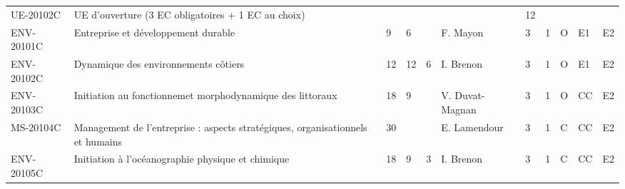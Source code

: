 \documentclass[a4paper,11pt]{article}
\begin{document}
{{\begin{tabular}{lllllllllll}
\rowcolor[HTML]{C0C0C0} 
UE-20102C                      & UE d'ouverture (3 EC obligatoires + 1 EC au choix)                                        &                           &                           &                           &                                    & 12                          &                             &                                    &                                  &                                  \\
ENV-20101C                     & Entreprise et développement durable                                                       & 9                         & 6                         &                           & F. Mayon                           & 3                           & 1                           & O                                  & E1                               & E2                               \\
ENV-20102C                     & Dynamique des environnements côtiers                                                      & 12                        & 12                        & 6                         & I. Brenon                          & 3                           & 1                           & O                                  & E1                               & E2                               \\
ENV-20103C                     & Initiation au fonctionnemet morphodynamique des littoraux                                 & 18                        & 9                         &                           & V. Duvat-Magnan                    & 3                           & 1                           & O                                  & CC                               & E2                               \\
MS-20104C                      & Management de l'entreprise : aspects stratégiques, organisationnels et humains            & 30                        &                           &                           & E. Lamendour                       & 3                           & 1                           & C                                  & CC                               & E2                               \\
ENV-20105C                     & Initiation à l'océanographie physique et chimique                                         & 18                        & 9                         & 3                         & I. Brenon                          & 3                           & 1                           & C                                  & CC                               & E2                               \\

\end{tabular}}}
\end{document}
